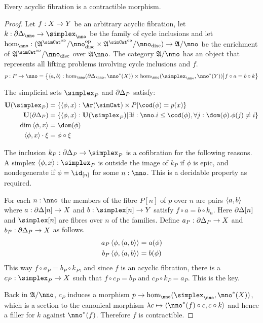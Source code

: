 \documentclass[csh.tex]{subfiles}
\begin{document}
\begin{lemma} Every acyclic fibration is a contractible morphism. \label{acyclic means contractible} \end{lemma}

\begin{proof}
Let $f: X\to Y$ be an arbitrary acyclic fibration, let $k\of\cycle_\nno\to\simplex_\nno$ be the family of cycle inclusions and 
let $\hom_\nno\of(\ambient\s/\nno\disc\dual\times \ambient\s/\nno\disc)\to \ambient/\nno$ be the enrichment of $\ambient\s/\nno\disc$ over $\ambient\nno$.
The category $\ambient/\nno$ has an object that represents all lifting problems involving cycle inclusions and $f$.
\[ p\of P\to \nno = \set{\tuplet{a,b}\of \hom_\nno(\cycle_\nno,\nno\ri(X))\times \hom_\nno(\simplex_\nno,\nno\ri(Y)) \middle|f\circ a = b\circ k} \]

The simplicial sets $\simplex_P$ and $\partial\Delta_P$ satisfy:
\begin{align*}
\base(\simplex_P) &= \set{ \tuplet{\phi,x}\of\Ar(\simCat)\times P | \cod(\phi) = p(x) } \\
\base(\cycle_P) &= \set{\tuplet{\phi,x}\of\base(\simplex_P)\middle|\exists i\of\nno.i\leq \cod(\phi),\forall j\of \dom(\phi).\phi(j)\neq i} \\
\dim\tuplet{\phi,x} &= \dom(\phi) \\
\tuplet{\phi,x}\cdot \xi &=\phi\circ\xi
\end{align*}

The inclusion $k_P\of\cycle_P\to\simplex_P$ is a cofibration for the following reasons. 
A simplex $\tuplet{\phi,x}\of\simplex_P$ is outside the image of $k_P$ if $\phi$ is epic, and nondegenerate if $\phi = \id_{[n]}$ for some $n\of \nno$. This is a decidable property as required.

For each $n\of\nno$ the members of the fibre $P[n]$ of $p$ over $n$ are pairs $\left\langle a,b \right\rangle$ where $a:\partial\Delta[n]\to X$ and $b\of \simplex[n]\to Y$ satisfy $f\circ a = b \circ k_n$. Here $\partial\Delta[n]$ and $\simplex[n]$ are fibres over $n$ of the families. Define $a_P: \partial\Delta_P\to X$ and $b_P: \partial\Delta_P\to X$ as follows.
\begin{align*}
a_P\left\langle \phi,\left\langle a,b \right\rangle \right\rangle &= a(\phi)\\
b_P\left\langle \phi,\left\langle a,b \right\rangle \right\rangle &= b(\phi)
\end{align*}
This way $f\circ a_P = b_P\circ k_P$, and since $f$ is an acyclic fibration, there is a $c_P\of \simplex_P\to X$ such that $f\circ c_P = b_P$ and $c_P\circ k_P = a_P$. This is the key.

Back in $\ambient/\nno$, $c_P$ induces a morphism $p\to\hom_\nno(\simplex_\nno,\nno\ri(X))$, which is a section to the canonical morphism $\function c\tuplet{\nno\ri(f)\circ c,c\circ k}$ and hence a filler for $k$ against $\nno\ri(f)$. Therefore $f$ is contractible.
\end{proof}
\end{document}
